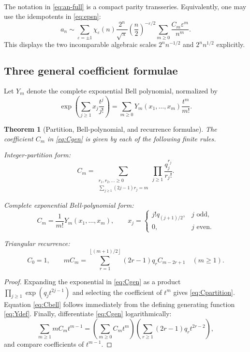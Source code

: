 \documentclass[11pt]{article}
\newtheorem{theorem}{Theorem}[section]
\theoremstyle{definition}
\theoremstyle{remark}
\newcommand{\eps}{\varepsilon}
\newcommand{\floor}[1]{\left\lfloor #1\right\rfloor}
\begin{document}
The notation in \eqref{eq:an-full} is a compact parity transseries.  Equivalently, one may use the idempotents in \eqref{eq:epsn}:
\begin{equation}\label{eq:idempotent-forward}
 a_n\sim\sum_{\eps=\pm1}\chi_\eps(n)
 \frac{2^n}{\sqrt\pi}\left(\frac{n}{2}\right)^{-\eps/2}
 \sum_{m\ge0}\frac{C_m\eps^m}{n^m}.
\end{equation}
This displays the two incomparable algebraic scales $2^nn^{-1/2}$ and $2^nn^{1/2}$ explicitly.

\subsection{Three general coefficient formulae}

Let $Y_m$ denote the complete exponential Bell polynomial, normalized by
\begin{equation}\label{eq:Ydef}
 \exp\!\left(\sum_{j\ge1}x_j\frac{t^j}{j!}\right)
 =\sum_{m\ge0}Y_m(x_1,\ldots,x_m)\frac{t^m}{m!}.
\end{equation}

\begin{theorem}[Partition, Bell-polynomial, and recurrence formulae]\label{thm:Cformula}
The coefficient $C_m$ in \eqref{eq:Cgen} is given by each of the following finite rules.

\emph{Integer-partition form:}
\begin{equation}\label{eq:Cpartition}
 C_m=\sum_{\substack{r_1,r_2,\ldots\ge0\\
             \sum_{j\ge1}(2j-1)r_j=m}}
       \prod_{j\ge1}\frac{q_j^{r_j}}{r_j!}.
\end{equation}

\emph{Complete exponential Bell-polynomial form:}
\begin{equation}\label{eq:Cbell}
 C_m=\frac1{m!}Y_m(x_1,\ldots,x_m),
 \qquad
 x_j=\begin{cases}
 j!q_{(j+1)/2},&j\text{ odd},\\
 0,&j\text{ even}.
 \end{cases}
\end{equation}

\emph{Triangular recurrence:}
\begin{equation}\label{eq:Crecurrence}
 C_0=1,
 \qquad
 mC_m=\sum_{r=1}^{\floor{(m+1)/2}}
 (2r-1)q_rC_{m-2r+1}\quad(m\ge1).
\end{equation}
\end{theorem}

\begin{proof}
Expanding the exponential in \eqref{eq:Cgen} as a product
$\prod_{j\ge1}\exp(q_jt^{2j-1})$ and selecting the coefficient of $t^m$ gives \eqref{eq:Cpartition}.  Equation \eqref{eq:Cbell} follows immediately from the defining generating function \eqref{eq:Ydef}.  Finally, differentiate \eqref{eq:Cgen} logarithmically:
\[
 \sum_{m\ge1}mC_mt^{m-1}
 =\left(\sum_{m\ge0}C_mt^m\right)
  \left(\sum_{r\ge1}(2r-1)q_rt^{2r-2}\right),
\]
and compare coefficients of $t^{m-1}$.
\end{proof}
\end{document}
